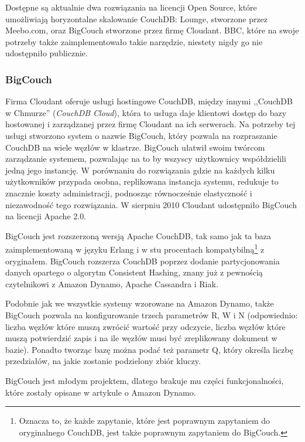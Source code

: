 Dostępne są aktualnie dwa rozwiązania na licencji Open Source, które umożliwiają horyzontalne skalowanie CouchDB: Lounge, stworzone przez Meebo.com, oraz BigCouch stworzone przez firmę Cloudant.
BBC, które na swoje potrzeby także zaimplementowało takie narzędzie, niestety nigdy go nie udostępniło publicznie.	

\subsubsection*{BigCouch}

Firma Cloudant oferuje usługi hostingowe CouchDB, między innymi ,,CouchDB w Chmurze'' (\emph{CouchDB Cloud}), która to usługa daje klientowi dostęp do bazy hostowanej i zarządzanej przez firmę Cloudant na ich serwerach.
Na potrzeby tej usługi stworzono system o nazwie BigCouch, który pozwala na rozpraszanie CouchDB na wiele węzłów w klastrze. 
BigCouch ułatwił swoim twórcom zarządzanie systemem, pozwalając na to by wszyscy użytkownicy współdzielili jedną jego instancję.
W porównaniu do rozwiązania gdzie na każdych kilku użytkowników przypada osobna, replikowana instancja systemu, redukuje to znacznie koszty administracji, podnosząc równocześnie elastyczność i niezawodność tego rozwiązania.
W sierpniu 2010 Cloudant udostępniło BigCouch na licencji Apache 2.0. 

BigCouch jest rozszerzoną wersją Apache CouchDB, tak samo jak ta baza zaimplementowaną w języku Erlang i w stu procentach kompatybilną\footnote{Oznacza to, że każde zapytanie, które jest poprawnym zapytaniem do oryginalnego CouchDB, jest także poprawnym zapytaniem do BigCouch.} z oryginałem.
BigCouch rozszerza CouchDB poprzez dodanie partycjonowania danych opartego o algorytm Consistent Hashing, znany już z pewnością czytelnikowi z Amazon Dynamo, Apache Cassandra i Riak.

Podobnie jak we wszystkie systemy wzorowane na Amazon Dynamo, także BigCouch pozwala na konfigurowanie trzech parametrów R, W i N (odpowiednio: liczba węzłów które muszą zwrócić wartość przy odczycie, liczba węzłów które muszą potwierdzić zapis i na ile węzłów musi być zreplikowany dokument w bazie).
Ponadto tworząc bazę można podać też parametr Q, który określa liczbę przedziałów, na jakie zostanie podzielony zbiór kluczy.

BigCouch jest młodym projektem, dlatego brakuje mu części funkcjonalności, które zostały opisane w artykule o Amazon Dynamo.

